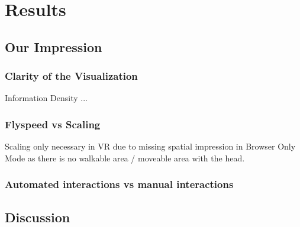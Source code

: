 \chapter{Results}

\section{Our Impression}

\subsection{Clarity of the Visualization}
Information Density ...

\subsection{Flyspeed vs Scaling}
Scaling only necessary in VR due to missing 
spatial impression in Browser Only Mode as there is no walkable area / moveable area with the head.

\subsection{Automated interactions vs manual interactions}

\section{Discussion}